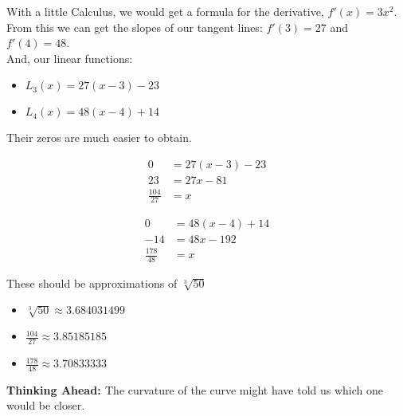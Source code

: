 \documentclass{ximera}
\begin{document}
\begin{example}
\begin{image}

\end{image}


With a little Calculus, we would get a formula for the derivative, $f'(x) = 3x^2$. \\

From this we can get the slopes of our tangent lines: $f'(3)=27$ and $f'(4) = 48$. \\


And, our linear functions:


\begin{itemize}
\item $L_{3}(x) = 27(x-3)-23$ \\
\item $L_{4}(x) = 48(x-4)+14$ \\
\end{itemize}


Their zeros are much easier to obtain.

\begin{align*}
0  &= 27(x-3)-23 \\
23 &= 27x - 81 \\
\frac{104}{27}   &= x
\end{align*}




\begin{align*}
0  &= 48(x-4)+14 \\
-14 &= 48x - 192 \\
\frac{178}{48}   &= x
\end{align*}


These should be approximations of $\sqrt[3]{50}$



\begin{itemize}
\item $\sqrt[3]{50} \approx 3.684031499$
\item $\frac{104}{27} \approx 3.85185185$
\item $\frac{178}{48} \approx 3.70833333$
\end{itemize}


\textbf{\textcolor{blue!55!black}{Thinking Ahead: }} The curvature of the curve might have told us which one would be closer.

\end{example}
\end{document}
